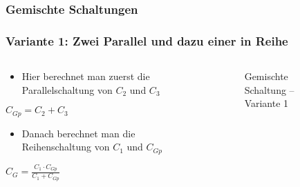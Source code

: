 \begin{frame}
\frametitle{Gemischte Schaltungen}
\end{frame}

\begin{frame}
\frametitle{Variante 1: Zwei Parallel und dazu einer in Reihe}
\begin{columns}
    \begin{column}{0.48\textwidth}
    \begin{itemize}
  \item Hier berechnet man zuerst die Parallelschaltung von $C_{ 2 }$ und $C_{ 3 }$
  \end{itemize}
$C_{ Gp } = C_{ 2 } + C_{ 3 }$

\begin{itemize}
  \item Danach berechnet man die Reihenschaltung von $C_{ 1 }$ und $C_{ Gp }$
  \end{itemize}
$C_{ G } = \frac{ C_{ 1 } \cdot C_{ Gp } }{ C_{ 1 } + C_{ Gp }}$


    \end{column}
   \begin{column}{0.48\textwidth}
       
\begin{figure}
    \caption{\scriptsize Gemischte Schaltung -- Variante 1}
    \label{e_gemischt_variante_1}
\end{figure}


   \end{column}
\end{columns}

\end{frame}

\begin{frame}
\end{frame}


